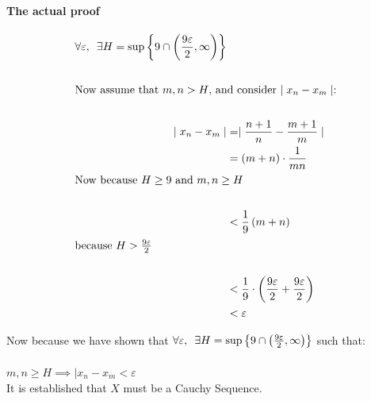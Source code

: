 \documentclass[class=article, crop=false]{standalone}
\begin{document}
\paragraph{The actual proof}
\begin{align}
  \forall \varepsilon, \enspace \exists H = \sup \left\{ 9 \cap \left( \frac{9\varepsilon}{2}, \infty \right) \right\} \notag \\
  \  \notag \\
  \intertext{Now assume that $m,n > H$, and consider $\mid x_{n} - x_m \mid$:} \notag \\
  \mid  x_{n} - x_{m}\mid &= \mid \frac{n+1}{n} - \frac{m+1}{m} \mid \\
  &= \left( m+n \right) \cdot \frac{1}{mn} \\
  \intertext{Now because $H \geq 9$ and $m,n \geq H$} \notag \\
  &< \frac{1}{9}\left( m+n \right) \notag \\
  \intertext{because $H>\frac{9\varepsilon}{2}$} \notag \\
  &< \frac{1}{9} \cdot \left( \frac{9\varepsilon}{2} + \frac{9\varepsilon}{2} \right) \notag \\
  &< \varepsilon
\end{align}

Now because we have shown that $
\forall \varepsilon, \enspace \exists H = \sup \left\{ 9 \cap \left( \frac{9\varepsilon}{2}, \infty \right) \right\} \notag $ such that: \\
\ \\
$m,n \geq H \implies \mid x_{n} - x_{m} < \varepsilon$
\ \\
It is established that $X$ must be a Cauchy Sequence.
\end{document}
